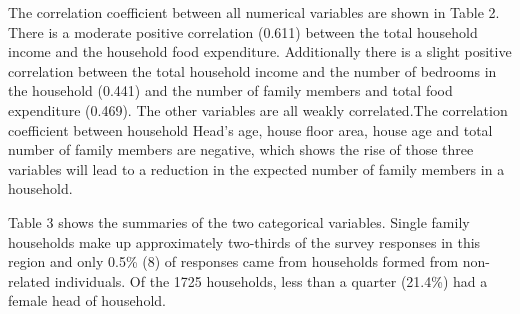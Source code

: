 \documentclass[
]{article}
\begin{document}
The correlation coefficient between all numerical variables are shown in
Table 2. There is a moderate positive correlation (0.611) between the
total household income and the household food expenditure. Additionally
there is a slight positive correlation between the total household
income and the number of bedrooms in the household (0.441) and the
number of family members and total food expenditure (0.469). The other
variables are all weakly correlated.The correlation coefficient between
household Head's age, house floor area, house age and total number of
family members are negative, which shows the rise of those three
variables will lead to a reduction in the expected number of family
members in a household.

\begin{table}

\caption{\label{tab:correlation}Correlation of all variables.}
\centering
{}
\end{table}

Table 3 shows the summaries of the two categorical variables. Single
family households make up approximately two-thirds of the survey
responses in this region and only 0.5\% (8) of responses came from
households formed from non-related individuals. Of the 1725 households,
less than a quarter (21.4\%) had a female head of household.
\end{document}
